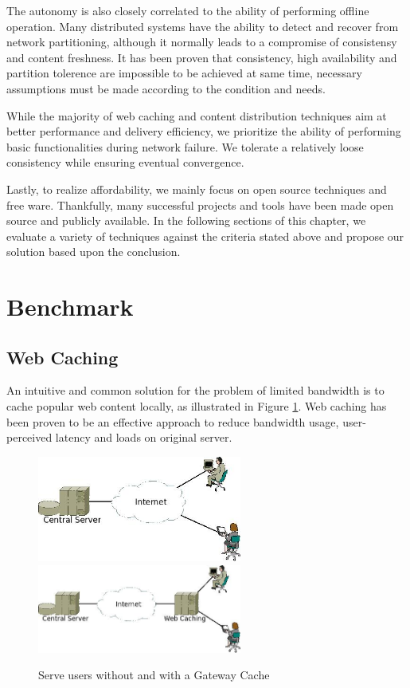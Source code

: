 The autonomy is also closely correlated to the ability of performing offline
operation. Many distributed systems have the ability to detect and recover from
network partitioning, although it normally leads to a compromise of consistensy
and content freshness. It has been proven that consistency, high availability and partition tolerence
are impossible to be achieved at same time\cite{brewer2000towards}\cite{gilbert2002brewer}, necessary assumptions must
be made according to the condition and needs.

While the majority of web caching and content distribution techniques aim at
better performance and delivery efficiency, we prioritize the ability of
performing basic functionalities during network failure. We tolerate a
relatively loose consistency while ensuring eventual convergence.

Lastly, to realize affordability, we mainly focus on open source techniques and
free ware. Thankfully, many successful projects and tools have been made open
source and publicly available. In the following sections of this chapter, we
evaluate a variety of techniques against the criteria stated above and propose
our solution based upon the conclusion.


\section{Benchmark}
\subsection{Web Caching}
An intuitive and common solution for the problem of limited bandwidth is to
cache popular web content locally, as illustrated in Figure \ref{with_cache}.
Web caching has been proven to be an effective approach to reduce bandwidth
usage, user-perceived latency and loads on original server\cite{davison2001web}.

\begin{figure}[h]
\centering
\includegraphics[width=0.6\textwidth]{../images/without_caching.jpeg}
\includegraphics[width=0.6\textwidth]{../images/with_caching.jpeg}
\caption{Serve users without and with a Gateway Cache}
\label{with_cache}
\end{figure}


